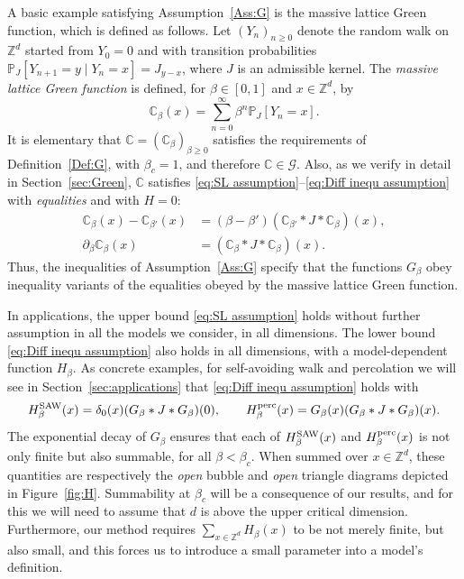 \documentclass[11pt,a4paper]{article}
\numberwithin{equation}{section}
\theoremstyle{plain}
\theoremstyle{definition}
\newcommand\1{\mathds{1}}
\begin{document}
A basic example satisfying Assumption~\ref{Ass:G} is the massive lattice Green function,
which is defined as follows.
Let $(Y_n)_{n \ge 0}$ denote the random walk on $\mathbb Z^d$ started from
$Y_0=0$ and with transition probabilities $\mathbb P_J[Y_{n+1}=y\mid Y_n=x]=J_{y-x}$,
where $J$ is an admissible kernel.
The \emph{massive lattice Green function} is defined, for $\beta \in [0,1]$ and
$x \in \mathbb Z^d$, by
\begin{equation}
\label{eq:Green-def}
  \mathbb C_\beta(x) = \sum_{n=0}^\infty \beta^n \mathbb P_J[Y_n=x].
\end{equation}
It is elementary that $\mathbb C=(\mathbb C_\beta)_{\beta\geq 0}$
satisfies the requirements of Definition~\ref{Def:G}, with
$\beta_c=1$, and therefore $\mathbb C \in \mathcal G$.
Also, as we verify in detail in Section~\ref{sec:Green},
$\mathbb C$ satisfies \eqref{eq:SL assumption}--\eqref{eq:Diff inequ assumption}
with \emph{equalities} and with $H=0$:
\begin{align}
\label{eq:Cub-intro}
    \mathbb C_\beta(x) - \mathbb C_{\beta'}(x)
    &=
    (\beta-\beta')(\mathbb C_{\beta'}*J*\mathbb C_\beta)(x),
\\
\label{eq:Clb-intro}
    \partial_\beta \mathbb C_\beta(x)
    &  =
    (\mathbb C_\beta * J * \mathbb C_\beta)(x).
\end{align}
Thus, the inequalities of Assumption~\ref{Ass:G} specify that the functions $G_\beta$
obey inequality variants of the equalities obeyed by the massive lattice Green function.

In applications, the upper bound \eqref{eq:SL assumption}
holds without further assumption in all the models
we consider, in all dimensions.  The lower bound
\eqref{eq:Diff inequ assumption} also holds in all dimensions,
with a model-dependent function $H_\beta$.  As concrete examples,
for self-avoiding walk and percolation we will see in Section~\ref{sec:applications}
that \eqref{eq:Diff inequ assumption} holds with
\begin{equation}
\label{eq:HSAWperc-intro}
    H^{\rm SAW}_\beta(x)=\delta_{0}(x)(G_\beta*J*G_\beta)(0), \qquad
    H^{{\rm{perc}}}_\beta(x) = G_\beta(x)(G_\beta*J*G_\beta)(x).
\end{equation}
The exponential decay of $G_\beta$ ensures that each of
$H^{\rm SAW}_\beta(x)$ and $H^{{\rm{perc}}}_\beta(x)$ is not only
finite but also summable,
for all $\beta < \beta_c$.
When summed over $x\in\mathbb Z^d$, these quantities are respectively the \emph{open} bubble
and \emph{open} triangle diagrams depicted in Figure~\ref{fig:H}. Summability at $\beta_c$ will be a consequence of our results, and for this
we will need to assume that $d$ is above the upper critical dimension.
Furthermore, our method requires $\sum_{x\in\mathbb Z^d}H_\beta(x)$ to be not merely finite,
but also small, and this
forces us to introduce a small parameter into a model's definition.
\end{document}
